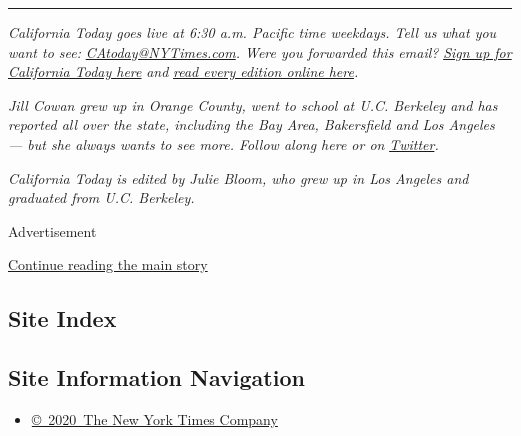 \begin{center}\rule{0.5\linewidth}{\linethickness}\end{center}

\emph{California Today goes live at 6:30 a.m. Pacific time weekdays.
Tell us what you want to see:}
\href{mailto:CAtoday@NYTimes.com}{\emph{CAtoday@NYTimes.com}}\emph{.
Were you forwarded this email?}
\href{https://www.nytimes3xbfgragh.onion/newsletters/california-today?module=inline}{\emph{Sign
up for California Today here}} \emph{and}
\href{https://www.nytimes3xbfgragh.onion/column/california-today}{\emph{read
every edition online here}}\emph{.}

\emph{Jill Cowan grew up in Orange County, went to school at U.C.
Berkeley and has reported all over the state, including the Bay Area,
Bakersfield and Los Angeles --- but she always wants to see more. Follow
along here or on}
\href{https://twitter.com/JillCowan}{\emph{Twitter}}\emph{.}

\emph{California Today is edited by Julie Bloom, who grew up in Los
Angeles and graduated from U.C. Berkeley.}

Advertisement

\protect\hyperlink{after-bottom}{Continue reading the main story}

\hypertarget{site-index}{%
\subsection{Site Index}\label{site-index}}

\hypertarget{site-information-navigation}{%
\subsection{Site Information
Navigation}\label{site-information-navigation}}

\begin{itemize}
\tightlist
\item
  \href{https://help.nytimes3xbfgragh.onion/hc/en-us/articles/115014792127-Copyright-notice}{©~2020~The
  New York Times Company}
\end{itemize}


